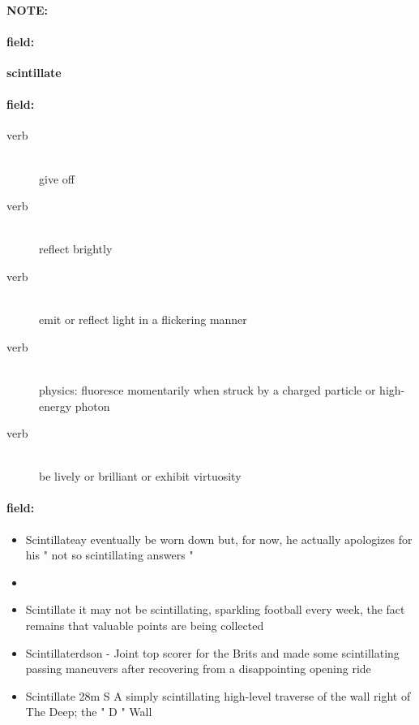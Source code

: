 \documentclass[12pt]{article}
\newenvironment{note}{\paragraph{NOTE:}}{}
\newenvironment{field}{\paragraph{field:}}{}
\begin{document}
\begin{note}
\begin{field}
\textbf{\large scintillate}
\end{field}


\begin{field}
\begin{description}
\item[verb] \hfill \\ 
give off

\item[verb] \hfill \\ 
reflect brightly

\item[verb] \hfill \\ 
emit or reflect light in a flickering manner

\item[verb] \hfill \\ 
physics: fluoresce momentarily when struck by a charged particle or high-energy photon

\item[verb] \hfill \\ 
be lively or brilliant or exhibit virtuosity

\end{description}
\end{field}

\begin{field}
\begin{itemize}
\item Scintillateay eventually be worn down but, for now, he actually apologizes for his " not so scintillating answers " 
\item 
\item Scintillate it may not be scintillating, sparkling football every week, the fact remains that valuable points are being collected
\item Scintillaterdson - Joint top scorer for the Brits and made some scintillating passing maneuvers after recovering from a disappointing opening ride
\item Scintillate 28m S A simply scintillating high-level traverse of the wall right of The Deep; the " D " Wall
\end{itemize}
\end{field}
\end{note}
\end{document}
